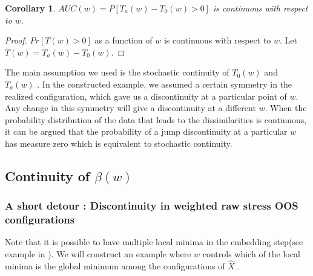 \documentclass[11pt]{article} %
\newtheorem{cor}[thm]{Corollary}
\begin{document}
\begin{cor}{
 $AUC(w)=P\left[T_a(w)-T_0(w) >0 \right]$ is continuous with respect to $w$.}
\end{cor}
\begin{proof}
 $Pr\left[T(w)>0 \right]$  as a function of $w$ is continuous with respect to $w$.  Let $T(w)=T_a(w)-T_0(w)$.
\end{proof}


The main assumption we used is the stochastic continuity of $T_0(w)$ and $T_a(w)$ .  In the constructed example, we assumed a certain symmetry in the realized configuration, which gave us a discontinuity at a particular  point of $w$. Any change in this symmetry will give a discontinuity at a different $w$. When the probability distribution of the data that leads to the dissimilarities is continuous, it can be argued that the probability of a  jump discontinuity at  a particular $w$ has measure zero which is equivalent to stochastic continuity.

 
\subsection{Continuity of $\beta(w)$} 

\subsubsection{ A short detour : Discontinuity in weighted raw stress OOS configurations\label{subsubsec:Discontinuity}}

Note that it is possible to have multiple local minima in the embedding step(see example in \cite{TrossetLocalMin}). We will construct an example  where $w$ controls which of the local minima is the global minimum among the configurations of $\hat{X}_{.}$.
 
\end{document}

